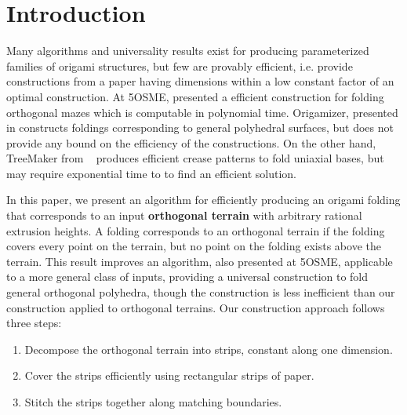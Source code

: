 \section{Introduction}
\label{sec:introduction}

Many algorithms and universality results exist for producing parameterized
families of origami structures, but few are provably efficient, i.e. provide
constructions from a paper having dimensions within a low constant factor of an
optimal construction. At 5OSME, \cite{MazeFolding_Origami5} presented a
efficient construction for folding orthogonal mazes which is computable in
polynomial time. Origamizer, presented in \cite{Origamizer_SoCG2017} constructs
foldings corresponding to general polyhedral surfaces, but does not provide any
bound on the efficiency of the constructions. On the other hand, TreeMaker from
~\cite{Lang} produces efficient crease patterns to fold uniaxial bases, but may
require exponential time to to find an efficient solution. 

In this paper, we present an algorithm for efficiently producing an origami
folding that corresponds to an input {\bf orthogonal terrain} with arbitrary
rational extrusion heights. A folding corresponds to an orthogonal terrain if
the folding covers every point on the terrain, but no point on the folding
exists above the terrain. This result improves an algorithm,
\cite{BoxPleating_Origami5} also presented at 5OSME, applicable to a more
general class of inputs, providing a universal construction to fold general
orthogonal polyhedra, though the construction is less inefficient than our
construction applied to orthogonal terrains. Our construction approach follows
three steps: 

\vspace{-0.2pc} 
\begin{enumerate} 
\item Decompose the orthogonal terrain into strips, constant along one dimension.
\item Cover the strips efficiently using rectangular strips of paper.
\item Stitch the strips together along matching boundaries.
\end{enumerate}
\vspace{-0.2pc}

